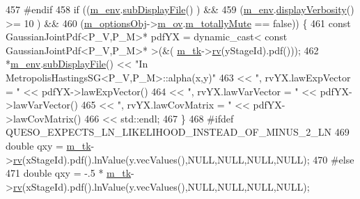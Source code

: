 \begin{DoxyCode}
457 \textcolor{preprocessor}{#endif}
458 \textcolor{preprocessor}{}        \textcolor{keywordflow}{if} ((\hyperlink{class_q_u_e_s_o_1_1_metropolis_hastings_s_g_ac8ea061e55b920e0c8f9bce5c3f20e52}{m\_env}.\hyperlink{class_q_u_e_s_o_1_1_base_environment_a8a0064746ae8dddfece4229b9ad374d6}{subDisplayFile}()                   ) &&
459             (\hyperlink{class_q_u_e_s_o_1_1_metropolis_hastings_s_g_ac8ea061e55b920e0c8f9bce5c3f20e52}{m\_env}.\hyperlink{class_q_u_e_s_o_1_1_base_environment_a1fe5f244fc0316a0ab3e37463f108b96}{displayVerbosity}() >= 10           ) &&
460             (\hyperlink{class_q_u_e_s_o_1_1_metropolis_hastings_s_g_a5d0bc9f73d50d272aa6bfb5ef5939ef3}{m\_optionsObj}->\hyperlink{class_q_u_e_s_o_1_1_metropolis_hastings_s_g_options_a9d4792d9fc2dc5439b8ab489b0c236eb}{m\_ov}.\hyperlink{class_q_u_e_s_o_1_1_mh_options_values_af812309e81191e88dfdc87c5815141a3}{m\_totallyMute} == \textcolor{keyword}{false})) \{
461           \textcolor{keyword}{const} GaussianJointPdf<P\_V,P\_M>* pdfYX = \textcolor{keyword}{dynamic\_cast<} \textcolor{keyword}{const }GaussianJointPdf<P\_V,P\_M>* \textcolor{keyword}{>}(&(
      \hyperlink{class_q_u_e_s_o_1_1_metropolis_hastings_s_g_a26e9680abddfb793486c995fa16f8c2d}{m\_tk}->\hyperlink{class_q_u_e_s_o_1_1_base_t_k_group_a6bd8e0bec0105471aad8801cbf1a0851}{rv}(yStageId).pdf()));
462           *\hyperlink{class_q_u_e_s_o_1_1_metropolis_hastings_s_g_ac8ea061e55b920e0c8f9bce5c3f20e52}{m\_env}.\hyperlink{class_q_u_e_s_o_1_1_base_environment_a8a0064746ae8dddfece4229b9ad374d6}{subDisplayFile}() << \textcolor{stringliteral}{"In MetropolisHastingsSG<P\_V,P\_M>::alpha(x,y)"}
463                                  << \textcolor{stringliteral}{", rvYX.lawExpVector = "} << pdfYX->lawExpVector()
464                                  << \textcolor{stringliteral}{", rvYX.lawVarVector = "} << pdfYX->lawVarVector()
465                                  << \textcolor{stringliteral}{", rvYX.lawCovMatrix = "} << pdfYX->lawCovMatrix()
466                                  << std::endl;
467         \}
468 \textcolor{preprocessor}{#ifdef QUESO\_EXPECTS\_LN\_LIKELIHOOD\_INSTEAD\_OF\_MINUS\_2\_LN}
469 \textcolor{preprocessor}{}        \textcolor{keywordtype}{double} qxy = \hyperlink{class_q_u_e_s_o_1_1_metropolis_hastings_s_g_a26e9680abddfb793486c995fa16f8c2d}{m\_tk}->\hyperlink{class_q_u_e_s_o_1_1_base_t_k_group_a6bd8e0bec0105471aad8801cbf1a0851}{rv}(xStageId).pdf().lnValue(y.vecValues(),NULL,NULL,NULL,NULL);
470 \textcolor{preprocessor}{#else}
471 \textcolor{preprocessor}{}        \textcolor{keywordtype}{double} qxy = -.5 * \hyperlink{class_q_u_e_s_o_1_1_metropolis_hastings_s_g_a26e9680abddfb793486c995fa16f8c2d}{m\_tk}->\hyperlink{class_q_u_e_s_o_1_1_base_t_k_group_a6bd8e0bec0105471aad8801cbf1a0851}{rv}(xStageId).pdf().lnValue(y.vecValues(),NULL,NULL,NULL,NULL);

\end{DoxyCode}

